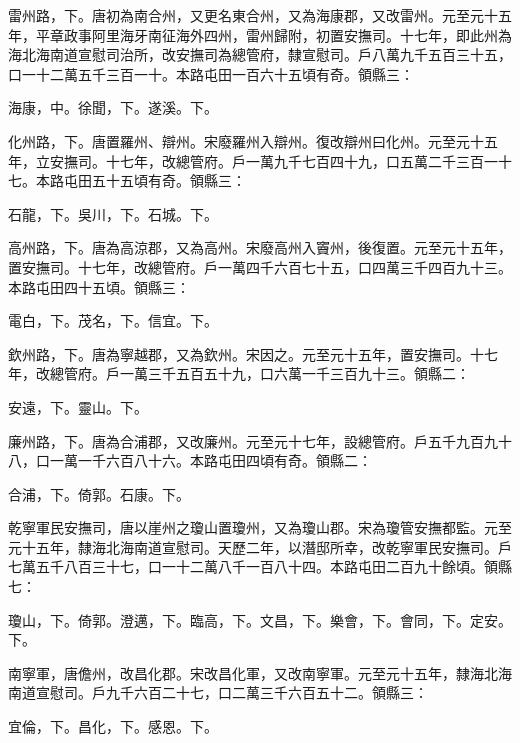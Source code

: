 \begin{pinyinscope}
 雷州路，下。唐初為南合州，又更名東合州，又為海康郡，又改雷州。元至元十五年，平章政事阿里海牙南征海外四州，雷州歸附，初置安撫司。十七年，即此州為海北海南道宣慰司治所，改安撫司為總管府，隸宣慰司。戶八萬九千五百三十五，口一十二萬五千三百一十。本路屯田一百六十五頃有奇。領縣三：



 海康，中。徐聞，下。遂溪。下。



 化州路，下。唐置羅州、辯州。宋廢羅州入辯州。復改辯州曰化州。元至元十五年，立安撫司。十七年，改總管府。戶一萬九千七百四十九，口五萬二千三百一十七。本路屯田五十五頃有奇。領縣三：



 石龍，下。吳川，下。石城。下。



 高州路，下。唐為高涼郡，又為高州。宋廢高州入竇州，後復置。元至元十五年，置安撫司。十七年，改總管府。戶一萬四千六百七十五，口四萬三千四百九十三。本路屯田四十五頃。領縣三：



 電白，下。茂名，下。信宜。下。



 欽州路，下。唐為寧越郡，又為欽州。宋因之。元至元十五年，置安撫司。十七年，改總管府。戶一萬三千五百五十九，口六萬一千三百九十三。領縣二：



 安遠，下。靈山。下。



 廉州路，下。唐為合浦郡，又改廉州。元至元十七年，設總管府。戶五千九百九十八，口一萬一千六百八十六。本路屯田四頃有奇。領縣二：



 合浦，下。倚郭。石康。下。



 乾寧軍民安撫司，唐以崖州之瓊山置瓊州，又為瓊山郡。宋為瓊管安撫都監。元至元十五年，隸海北海南道宣慰司。天歷二年，以潛邸所幸，改乾寧軍民安撫司。戶七萬五千八百三十七，口一十二萬八千一百八十四。本路屯田二百九十餘頃。領縣七：



 瓊山，下。倚郭。澄邁，下。臨高，下。文昌，下。樂會，下。會同，下。定安。下。



 南寧軍，唐儋州，改昌化郡。宋改昌化軍，又改南寧軍。元至元十五年，隸海北海南道宣慰司。戶九千六百二十七，口二萬三千六百五十二。領縣三：



 宜倫，下。昌化，下。感恩。下。




\end{pinyinscope}
